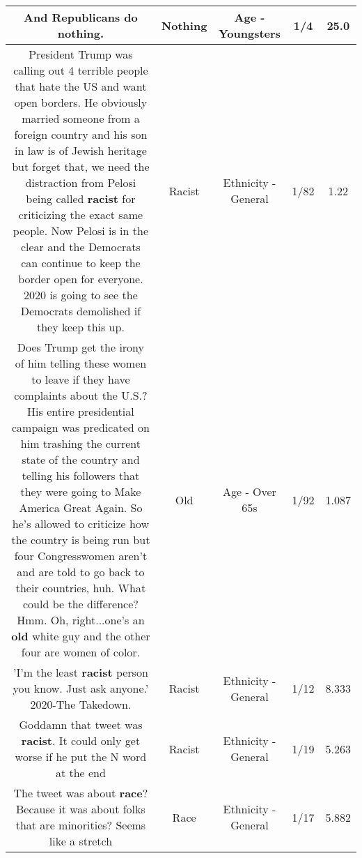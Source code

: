 \documentclass[11pt]{article}
\newlength\mylength
\begin{document}
\begin{center}
\begin{longtable}{|C{.65\mylength}|C{.30\mylength}|C{.12\mylength}|C{.12\mylength}|C{.12\mylength}|}
  \small And Republicans do \textbf{nothing}.\normalsize   & Nothing & Age - Youngsters & 1/4 & 25.0 \\  \hline
  \small President Trump was calling out 4 terrible people that hate the US and want open borders. He obviously married someone from a foreign country and his son in law is of Jewish heritage but forget that, we need the distraction from Pelosi being called \textbf{racist} for criticizing the exact same people. Now Pelosi is in the clear and the Democrats can continue to keep the border open for everyone. 2020 is going to see the Democrats demolished if they keep this up.\normalsize   & Racist & Ethnicity - General & 1/82 & 1.22 \\  \hline
  \small Does Trump get the irony of him telling these women to leave if they have complaints about the U.S.? His entire presidential campaign was predicated on him trashing the current state of the country and telling his followers that they were going to Make America Great Again. So he's allowed to criticize how the country is being run but four Congresswomen aren't and are told to go back to their countries, huh. What could be the difference? Hmm. Oh, right...one's an \textbf{old} white guy and the other four are women of color.\normalsize   & Old & Age - Over 65s & 1/92 & 1.087 \\  \hline
  \small 'I'm the least \textbf{racist} person you know. Just ask anyone.' 2020-The Takedown.\normalsize   & Racist & Ethnicity - General & 1/12 & 8.333 \\  \hline
  \small Goddamn that tweet was \textbf{racist}. It could only get worse if he put the N word at the end\normalsize   & Racist & Ethnicity - General & 1/19 & 5.263 \\  \hline
  \small The tweet was about \textbf{race}? Because it was about folks that are minorities? Seems like a stretch\normalsize   & Race & Ethnicity - General & 1/17 & 5.882 \\  \hline

\end{longtable}
\end{center}
\end{document}
